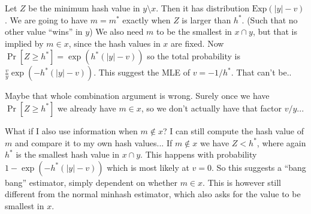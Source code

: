 Let $Z$ be the minimum hash value in $y\setminus x$. Then it has distribution $\text{Exp}(|y|-v)$.
We are going to have $m=m^*$ exactly when $Z$ is larger than $h^*$.
(Such that no other value ``wins'' in $y$)
We also need $m$ to be the smallest in $x\cap y$, but that is implied by $m\in x$, since the hash values in $x$ are fixed.
Now $\Pr[Z \ge h^*] = \exp(h^*(|y|-v))$
so the total probability is $\frac{v}{y}\exp(-h^*(|y|-v))$.
This suggest the MLE of $v=-1/h^*$.
That can't be..

Maybe that whole combination argument is wrong.
Surely once we have $\Pr[Z\ge h^*]$ we already have $m\in x$, so we don't actually have that factor $v/y$...

What if I also use information when $m\not\in x$?
I can still compute the hash value of $m$ and compare it to my own hash values...
If $m\not\in x$ we have $Z < h^*$, where again $h^*$ is the smallest hash value in $x\cap y$.
This happens with probability $1-\exp(-h^*(|y|-v))$ which is most likely at $v=0$.
So this suggests a ``bang bang'' estimator, simply dependent on whether $m\in x$.
This is however still different from the normal minhash estimator, which also asks for the value to be smallest in $x$.

